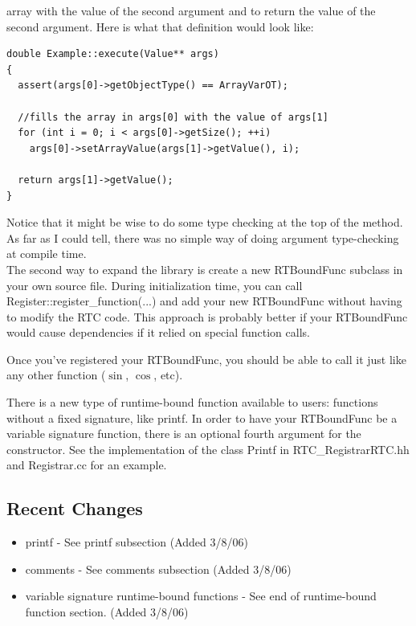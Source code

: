 \documentclass{article}
\begin{document}
array with the value of the second argument and to return the value of the
second argument. Here is what that definition would look like:
{\ttfamily \begin{verbatim}
double Example::execute(Value** args) 
{
  assert(args[0]->getObjectType() == ArrayVarOT);

  //fills the array in args[0] with the value of args[1]
  for (int i = 0; i < args[0]->getSize(); ++i) 
    args[0]->setArrayValue(args[1]->getValue(), i);

  return args[1]->getValue();
}
\end{verbatim} }
\noindent
Notice that it might be wise to do some type checking at the top of the 
method. As far as I could tell, there was no simple way of doing argument
type-checking at compile time. \\

\noindent
The second way to expand the library is create a new RTBoundFunc subclass in
your own source file. During initialization time, you can call 
Register::register\_function(...) and add your new RTBoundFunc without having
to modify the RTC code. This approach is probably better if your RTBoundFunc
would cause dependencies if it relied on special function calls. 

\noindent
Once you've registered your RTBoundFunc, you should be able to call it just 
like any other function ($\sin$, $\cos$, etc).

\noindent
There is a new type of runtime-bound function available to users: functions
without a fixed signature, like printf. In order to have your RTBoundFunc be
a variable signature function, there is an optional fourth argument for the
constructor. See the implementation of the class Printf in RTC\_RegistrarRTC.hh and
Registrar.cc for an example.

\subsection{Recent Changes}

\begin{itemize}
  \item printf - See printf subsection (Added 3/8/06)
  \item comments - See comments subsection (Added 3/8/06)
  \item variable signature runtime-bound functions - See end of runtime-bound 
        function section. (Added 3/8/06)
\end{itemize}
\end{document}
